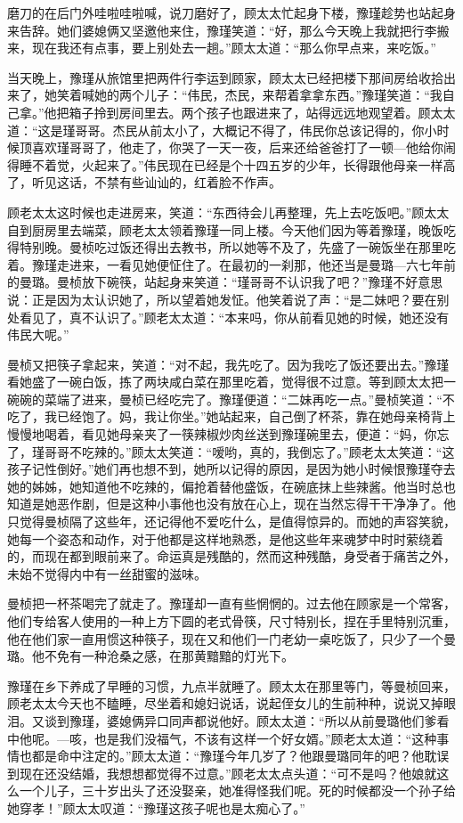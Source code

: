 \par 磨刀的在后门外哇啦哇啦喊，说刀磨好了，顾太太忙起身下楼，豫瑾趁势也站起身来告辞。她们婆媳俩又坚邀他来住，豫瑾笑道：“好，那么今天晚上我就把行李搬来，现在我还有点事，要上别处去一趟。”顾太太道：“那么你早点来，来吃饭。”
\par 当天晚上，豫瑾从旅馆里把两件行李运到顾家，顾太太已经把楼下那间房给收拾出来了，她笑着喊她的两个儿子：“伟民，杰民，来帮着拿拿东西。”豫瑾笑道：“我自己拿。”他把箱子拎到房间里去。两个孩子也跟进来了，站得远远地观望着。顾太太道：“这是瑾哥哥。杰民从前太小了，大概记不得了，伟民你总该记得的，你小时候顶喜欢瑾哥哥了，他走了，你哭了一天一夜，后来还给爸爸打了一顿—他给你闹得睡不着觉，火起来了。”伟民现在已经是个十四五岁的少年，长得跟他母亲一样高了，听见这话，不禁有些讪讪的，红着脸不作声。
\par 顾老太太这时候也走进房来，笑道：“东西待会儿再整理，先上去吃饭吧。”顾太太自到厨房里去端菜，顾老太太领着豫瑾一同上楼。今天他们因为等着豫瑾，晚饭吃得特别晚。曼桢吃过饭还得出去教书，所以她等不及了，先盛了一碗饭坐在那里吃着。豫瑾走进来，一看见她便怔住了。在最初的一刹那，他还当是曼璐—六七年前的曼璐。曼桢放下碗筷，站起身来笑道：“瑾哥哥不认识我了吧？”豫瑾不好意思说：正是因为太认识她了，所以望着她发怔。他笑着说了声：“是二妹吧？要在别处看见了，真不认识了。”顾老太太道：“本来吗，你从前看见她的时候，她还没有伟民大呢。”
\par 曼桢又把筷子拿起来，笑道：“对不起，我先吃了。因为我吃了饭还要出去。”豫瑾看她盛了一碗白饭，拣了两块咸白菜在那里吃着，觉得很不过意。等到顾太太把一碗碗的菜端了进来，曼桢已经吃完了。豫瑾便道：“二妹再吃一点。”曼桢笑道：“不吃了，我已经饱了。妈，我让你坐。”她站起来，自己倒了杯茶，靠在她母亲椅背上慢慢地喝着，看见她母亲夹了一筷辣椒炒肉丝送到豫瑾碗里去，便道：“妈，你忘了，瑾哥哥不吃辣的。”顾太太笑道：“嗳哟，真的，我倒忘了。”顾老太太笑道：“这孩子记性倒好。”她们再也想不到，她所以记得的原因，是因为她小时候恨豫瑾夺去她的姊姊，她知道他不吃辣的，偏抢着替他盛饭，在碗底抹上些辣酱。他当时总也知道是她恶作剧，但是这种小事他也没有放在心上，现在当然忘得干干净净了。他只觉得曼桢隔了这些年，还记得他不爱吃什么，是值得惊异的。而她的声容笑貌，她每一个姿态和动作，对于他都是这样地熟悉，是他这些年来魂梦中时时萦绕着的，而现在都到眼前来了。命运真是残酷的，然而这种残酷，身受者于痛苦之外，未始不觉得内中有一丝甜蜜的滋味。
\par 曼桢把一杯茶喝完了就走了。豫瑾却一直有些惘惘的。过去他在顾家是一个常客，他们专给客人使用的一种上方下圆的老式骨筷，尺寸特别长，捏在手里特别沉重，他在他们家一直用惯这种筷子，现在又和他们一门老幼一桌吃饭了，只少了一个曼璐。他不免有一种沧桑之感，在那黄黯黯的灯光下。
\par 豫瑾在乡下养成了早睡的习惯，九点半就睡了。顾太太在那里等门，等曼桢回来，顾老太太今天也不瞌睡，尽坐着和媳妇说话，说起侄女儿的生前种种，说说又掉眼泪。又谈到豫瑾，婆媳俩异口同声都说他好。顾太太道：“所以从前曼璐他们爹看中他呢。—咳，也是我们没福气，不该有这样一个好女婿。”顾老太太道：“这种事情也都是命中注定的。”顾太太道：“豫瑾今年几岁了？他跟曼璐同年的吧？他耽误到现在还没结婚，我想想都觉得不过意。”顾老太太点头道：“可不是吗？他娘就这么一个儿子，三十岁出头了还没娶亲，她准得怪我们呢。死的时候都没一个孙子给她穿孝！”顾太太叹道：“豫瑾这孩子呢也是太痴心了。”
